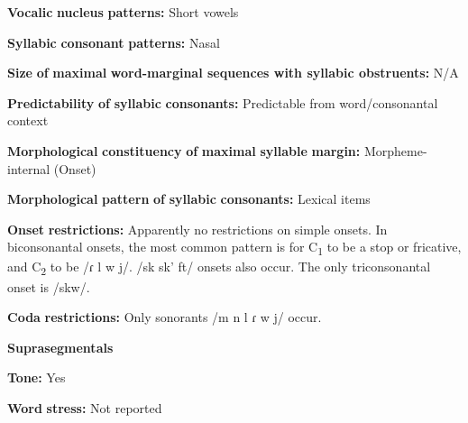 \documentclass[output=paper]{langsci/langscibook}
\begin{document}
\begin{styleBody}
\textbf{Vocalic} \textbf{nucleus} \textbf{patterns:} Short vowels
\end{styleBody}

\begin{styleBody}
\textbf{Syllabic} \textbf{consonant} \textbf{patterns:} Nasal
\end{styleBody}

\begin{styleBody}
\textbf{Size} \textbf{of} \textbf{maximal} \textbf{word{}-marginal sequences with syllabic obstruents:} N/A
\end{styleBody}

\begin{styleBody}
\textbf{Predictability} \textbf{of} \textbf{syllabic} \textbf{consonants:} Predictable from word/consonantal context
\end{styleBody}

\begin{styleBody}
\textbf{Morphological} \textbf{constituency} \textbf{of} \textbf{maximal} \textbf{syllable} \textbf{margin:} Morpheme-internal (Onset)
\end{styleBody}

\begin{styleBody}
\textbf{Morphological} \textbf{pattern} \textbf{of} \textbf{syllabic} \textbf{consonants:} Lexical items
\end{styleBody}

\begin{styleBody}
\textbf{Onset} \textbf{restrictions:} Apparently no restrictions on simple onsets. In biconsonantal onsets, the most common pattern is for C\textsubscript{1} to be a stop or fricative, and C\textsubscript{2} to be /ɾ l w j/. /sk sk’ ft/ onsets also occur. The only triconsonantal onset is /skw/.
\end{styleBody}

\begin{styleBody}
\textbf{Coda} \textbf{restrictions:} Only sonorants /m n l ɾ w j/ occur.
\end{styleBody}

\begin{styleBody}
\textbf{Suprasegmentals}
\end{styleBody}

\begin{styleBody}
\textbf{Tone:} Yes
\end{styleBody}

\begin{styleBody}
\textbf{Word} \textbf{stress:} Not reported
\end{styleBody}
\end{document}
